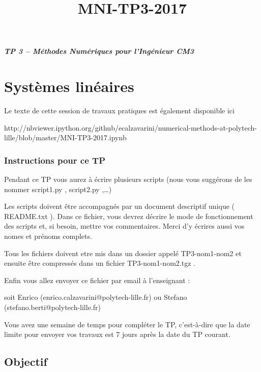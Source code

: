 \documentclass[11pt]{article}
\title{MNI-TP3-2017}
\begin{document}
    
    \date{}  
  
    \maketitle
    
    

    
    \subparagraph{TP 3 -- Méthodes Numériques pour l'Ingénieur
CM3}\label{tp-3-muxe9thodes-numuxe9riques-pour-linguxe9nieur-cm3}

    \section{Systèmes linéaires}\label{systuxe8mes-linuxe9aires}

    Le texte de cette session de travaux pratiques est également disponible
ici

http://nbviewer.ipython.org/github/ecalzavarini/numerical-methods-at-polytech-lille/blob/master/MNI-TP3-2017.ipynb

    \subsubsection{Instructions pour ce TP}\label{instructions-pour-ce-tp}

    Pendant ce TP vous aurez à écrire plusieurs scripts (nous vous suggérons
de les nommer script1.py , script2.py ,\ldots{})

    Les scripts doivent être accompagnés par un document descriptif unique (
README.txt ). Dans ce fichier, vous devrez décrire le mode de
fonctionnement des scripts et, si besoin, mettre vos commentaires. Merci
d'y écrires aussi vos nomes et prénoms complets.

    Tous les fichiers doivent etre mis dans un dossier appelé TP3-nom1-nom2
et ensuite être compressés dans un fichier TP3-nom1-nom2.tgz .

    Enfin vous allez envoyer ce fichier par email à l'enseignant :

soit Enrico (enrico.calzavarini@polytech-lille.fr) ou Stefano
(stefano.berti@polytech-lille.fr)

    Vous avez une semaine de temps pour compléter le TP, c'est-à-dire que la
date limite pour envoyer vos travaux est 7 jours après la date du TP
courant.

    \subsection{Objectif}\label{objectif}
\end{document}
